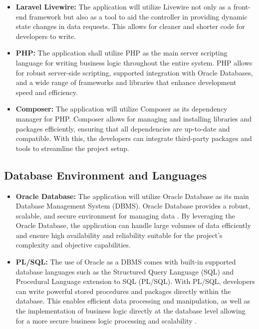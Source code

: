     \begin{itemize}
        \item[] \textbf{Laravel Livewire:} The application will utilize Livewire not only as a front-end framework but also as a tool to aid the controller in providing dynamic state changes in data requests. This allows for cleaner and shorter code for developers to write.
        \item[] \textbf{PHP:} The application shall utilize PHP as the main server scripting language for writing business logic throughout the entire system. PHP allows for robust server-side scripting, supported integration with Oracle Databases, and a wide range of frameworks and libraries that enhance development speed and efficiency. 
        \item[] \textbf{Composer:} The application will utilize Composer as its dependency manager for PHP. Composer allows for managing and installing libraries and packages efficiently, ensuring that all dependencies are up-to-date and compatible. With this, the developers can integrate third-party packages and tools to streamline the project setup.
      
    \end{itemize}

\subsection{Database Environment and Languages}
    \begin{itemize}    
        \item[] \textbf{Oracle Database:} The application will utilize Oracle Database as its main Database Management System (DBMS). Oracle Database provides a robust, scalable, and secure environment for managing data \cite{oracle2nd}. By leveraging the Oracle Database, the application can handle large volumes of data efficiently and ensure high availability and reliability suitable for the project's complexity and objective capabilities.
        \item[] \textbf{PL/SQL:} The use of Oracle as a DBMS comes with built-in supported database languages such as the Structured Query Language (SQL) and Procedural Language extension to SQL (PL/SQL). With PL/SQL, developers can write powerful stored procedures and packages directly within the database. This enables efficient data processing and manipulation, as well as the implementation of business logic directly at the database level allowing for a more secure business logic processing and scalability \cite{oracle1nd}. 
    \end{itemize}